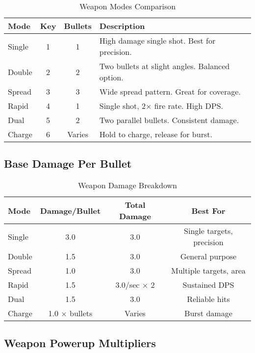 \documentclass[11pt,a4paper]{article}
\begin{document}
\begin{table}[h]
\centering
\small
\begin{tabularx}{\textwidth}{|l|c|c|X|}
\hline
\rowcolor{primarycolor!20}
\textbf{Mode} & \textbf{Key} & \textbf{Bullets} & \textbf{Description} \\
\hline
Single & 1 & 1 & High damage single shot. Best for precision. \\
\hline
Double & 2 & 2 & Two bullets at slight angles. Balanced option. \\
\hline
Spread & 3 & 3 & Wide spread pattern. Great for coverage. \\
\hline
Rapid & 4 & 1 & Single shot, 2× fire rate. High DPS. \\
\hline
Dual & 5 & 2 & Two parallel bullets. Consistent damage. \\
\hline
Charge & 6 & Varies & Hold to charge, release for burst. \\
\hline
\end{tabularx}
\caption{Weapon Modes Comparison}
\end{table}

\subsection{Base Damage Per Bullet}

\begin{table}[h]
\centering
\begin{tabularx}{\textwidth}{|l|c|c|c|}
\hline
\rowcolor{primarycolor!20}
\textbf{Mode} & \textbf{Damage/Bullet} & \textbf{Total Damage} & \textbf{Best For} \\
\hline
Single & 3.0 & 3.0 & Single targets, precision \\
\hline
Double & 1.5 & 3.0 & General purpose \\
\hline
Spread & 1.0 & 3.0 & Multiple targets, area \\
\hline
Rapid & 1.5 & 3.0/sec × 2 & Sustained DPS \\
\hline
Dual & 1.5 & 3.0 & Reliable hits \\
\hline
Charge & 1.0 × bullets & Varies & Burst damage \\
\hline
\end{tabularx}
\caption{Weapon Damage Breakdown}
\end{table}

\subsection{Weapon Powerup Multipliers}
\end{document}

